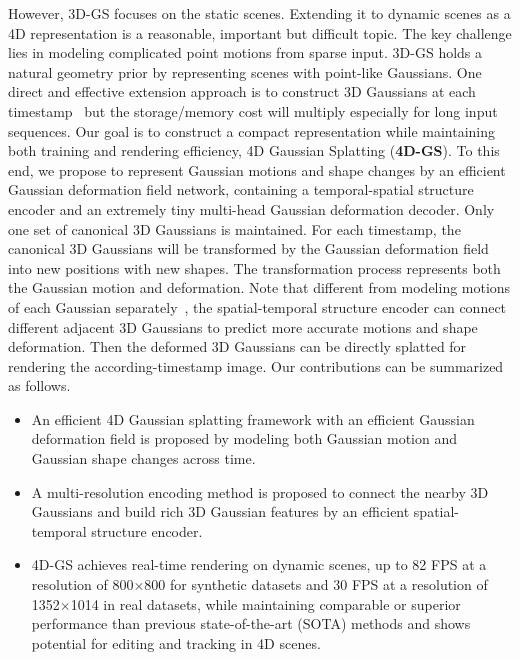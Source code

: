 However, 3D-GS focuses on the static scenes. Extending it to dynamic scenes as a 4D representation is a reasonable, important but difficult topic. The key challenge lies in modeling complicated point motions from sparse input. 3D-GS holds a natural geometry prior by representing scenes with point-like Gaussians. One direct and effective extension approach is to construct 3D Gaussians at each timestamp~\cite{dynamic3dgs} but the storage/memory cost will multiply especially for long input sequences. Our goal is to construct a compact representation while maintaining both training and rendering efficiency, \ie 4D Gaussian Splatting (\textbf{4D-GS}). To this end, we propose to represent Gaussian motions and shape changes by an efficient Gaussian deformation field network, containing a temporal-spatial structure encoder and an extremely tiny multi-head Gaussian deformation decoder. Only one set of canonical 3D Gaussians is maintained. For each timestamp, the canonical 3D Gaussians will be transformed by the Gaussian deformation field into new positions with new shapes. The transformation process represents both the Gaussian motion and deformation. Note that different from modeling motions of each Gaussian separately~\cite{dynamic3dgs,4dgs-2}, the spatial-temporal structure encoder can connect different adjacent 3D Gaussians to predict more accurate motions and shape deformation. Then the deformed 3D Gaussians can be directly splatted for rendering the according-timestamp image. Our contributions can be summarized as follows.

\begin{itemize}
     \item An efficient 4D Gaussian splatting framework with an efficient Gaussian deformation field is proposed by modeling both Gaussian motion and Gaussian shape changes across time.
     \item A multi-resolution encoding method is proposed to connect the nearby 3D Gaussians and build rich 3D Gaussian features by an efficient spatial-temporal structure encoder. 
     \item 4D-GS achieves real-time rendering on dynamic scenes, up to 82 FPS at a resolution of 800$\times$800 for synthetic datasets and 30 FPS at a resolution of 1352$\times$1014 in real datasets, while maintaining comparable or superior performance than previous state-of-the-art (SOTA) methods and shows potential for editing and tracking in 4D scenes.
\end{itemize}